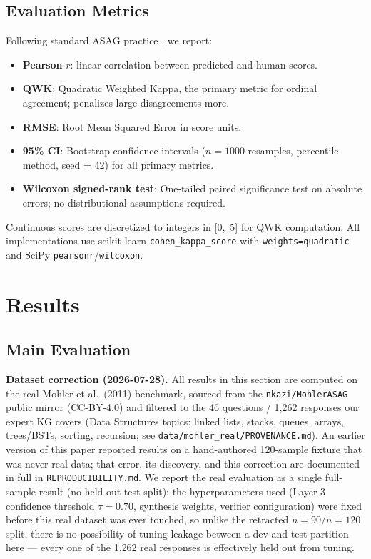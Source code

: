 \documentclass[conference]{IEEEtran}
\begin{document}
\subsection{Evaluation Metrics}

Following standard ASAG practice \cite{mohler2011,sultan2016}, we report:
\begin{itemize}
  \item \textbf{Pearson} $r$: linear correlation between predicted and human scores.
  \item \textbf{QWK}: Quadratic Weighted Kappa, the primary metric for ordinal
        agreement; penalizes large disagreements more.
  \item \textbf{RMSE}: Root Mean Squared Error in score units.
  \item \textbf{95\% CI}: Bootstrap confidence intervals ($n = 1000$ resamples,
        percentile method, seed = 42) for all primary metrics.
  \item \textbf{Wilcoxon signed-rank test}: One-tailed paired significance test
        on absolute errors; no distributional assumptions required.
\end{itemize}

Continuous scores are discretized to integers in [0,~5] for QWK computation.
All implementations use scikit-learn \texttt{cohen\_kappa\_score} with
\texttt{weights=\textquotesingle quadratic\textquotesingle} and
SciPy \texttt{pearsonr}/\texttt{wilcoxon}.

\section{Results}
\label{sec:results}

\subsection{Main Evaluation}

\textbf{Dataset correction (2026-07-28).} All results in this section are
computed on the real Mohler et al.\ (2011) benchmark, sourced from the
\texttt{nkazi/MohlerASAG} public mirror (CC-BY-4.0) and filtered to the
46 questions / 1{,}262 responses our expert KG covers (Data Structures
topics: linked lists, stacks, queues, arrays, trees/BSTs, sorting,
recursion; see \texttt{data/mohler\_real/PROVENANCE.md}). An earlier
version of this paper reported results on a hand-authored 120-sample
fixture that was never real data; that error, its discovery, and this
correction are documented in full in \texttt{REPRODUCIBILITY.md}. We
report the real evaluation as a single full-sample result (no held-out
test split): the hyperparameters used (Layer-3 confidence threshold
$\tau=0.70$, synthesis weights, verifier configuration) were fixed
before this real dataset was ever touched, so unlike the retracted
$n=90$/$n=120$ split, there is no possibility of tuning leakage between
a dev and test partition here --- every one of the 1{,}262 real
responses is effectively held out from tuning.
\end{document}
